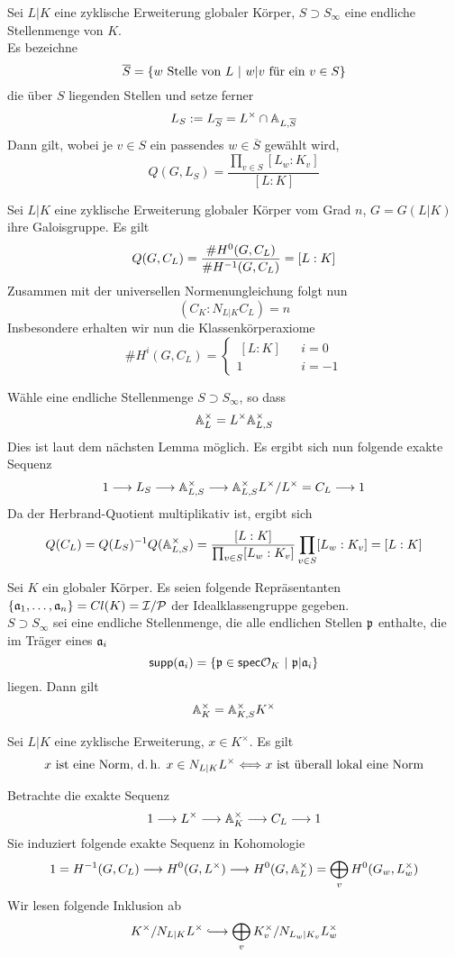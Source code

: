\Satz{}
Sei $L|K$ eine zyklische Erweiterung globaler Körper, $S \supset S_\infty$ eine endliche Stellenmenge von $K$.\\
Es bezeichne 
\[\overline{S} = \set{w \text{ Stelle von }L}{w|v \text{ für ein } v \in S} \]
die über $S$ liegenden Stellen und setze ferner
\[ L_S := L_{\overline{S}} = L^\times \cap \mathbb{A}_{L,\overline{S}} \]
Dann gilt, wobei je $v \in S$ ein passendes $w\in \overline{S}$ gewählt wird,
\[ Q(G,L_S) = \frac{\prod_{v\in S} [L_w : K_v]}{[L:K]} \]

\Satz{}
Sei $L|K$ eine zyklische Erweiterung globaler Körper vom Grad $n$, $G = G(L|K)$ ihre Galoisgruppe. Es gilt
\[ Q(G, C_L) = \frac{\# H^0(G,C_L)}{\# H^{-1}(G,C_L)} = [L:K]  \]
Zusammen mit der universellen Normenungleichung  folgt nun
\[ (C_K : N_{L|K} C_L ) = n \]
Insbesondere erhalten wir nun die Klassenkörperaxiome
\[ \# H^i(G,C_L) = \left\lbrace
\begin{aligned}
\ [L:K] && i = 0\\
1 && i = -1
\end{aligned}
\right. \]

\begin{Beweis}{}
Wähle eine endliche Stellenmenge $S \supset S_\infty$, so dass
\[ \mathbb{A}_L^\times = L^\times \mathbb{A}_{L,S}^\times \]
Dies ist laut dem nächsten Lemma möglich. Es ergibt sich nun folgende exakte Sequenz
\[ 1 \overset{}{\longrightarrow} L_S \overset{}{\longrightarrow} \mathbb{A}_{L,S}^\times \overset{}{\longrightarrow} \mathbb{A}_{L,S}^\times L^\times /L^\times = C_L \overset{}{\longrightarrow} 1 \]
Da der Herbrand-Quotient multiplikativ ist, ergibt sich
\[ Q(C_L) = Q(L_S)^{-1} Q(\mathbb{A}_{L,S}^\times) = \frac{[L:K]}{\prod_{v\in S} [L_w : K_v]} \prod_{v\in S} [L_w : K_v] = [L:K] \]
\end{Beweis}

\Lem{}
Sei $K$ ein globaler Körper. Es seien folgende Repräsentanten $\{\mathfrak{a}_1,\ldots , \mathfrak{a}_n \} = Cl(K) = \mathcal{I} / \mathcal{P}$ der Idealklassengruppe gegeben.\\
$S \supset S_\infty$ sei eine endliche Stellenmenge, die alle endlichen Stellen $\mathfrak{p}$ enthalte, die im Träger eines $\mathfrak{a}_i$
\[ \textsf{supp}(\af_i) = \set{\pf \in \textsf{spec}\O_K}{\pf | \af_i} \]
liegen. Dann gilt
\[ \mathbb{A}_K^\times = \mathbb{A}_{K,S}^\times K^\times \]

Sei $L|K$ eine zyklische Erweiterung, $x \in K^\times$. Es gilt
\[ x \text{ ist eine Norm, d.\,h. } x \in N_{L|K}L^\times \overset{}{\Longleftrightarrow} x \text{ ist überall lokal eine Norm} \]
\begin{Beweis}{}
Betrachte die exakte Sequenz
\[ 1 \overset{}{\longrightarrow} L^\times \overset{}{\longrightarrow} \mathbb{A}_K^\times \overset{}{\longrightarrow} C_L \overset{}{\longrightarrow} 1 \]
Sie induziert folgende exakte Sequenz in Kohomologie
\[ 1 = H^{-1}(G,C_L) \overset{}{\longrightarrow} H^0(G,L^\times) \overset{}{\longrightarrow} H^0(G,\mathbb{A}_L^\times) = \bigoplus_v H^0(G_w, L_w^\times) \]
Wir lesen folgende Inklusion ab
\[ K^\times / N_{L|K}L^\times \Inj{} \bigoplus_v K_v^\times / N_{L_w|K_v}L_w^\times \]
\end{Beweis}